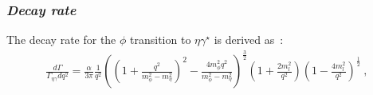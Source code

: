 \subsubsection{\emph{Decay rate}}
The decay rate for the $\phi$ transition to $\eta \gamma^\star$ is derived as~\cite{landsberg}:
\begin{align}
\frac{d\Gamma}{\Gamma_{\eta\gamma} dq^2} = \frac{\alpha}{3 \pi} \frac{1}{q^2} \left( \left(1+ \frac{q^2}{m_{\phi}^2 - m_{\eta}^2} \right)^2 - \frac{4 m_{\phi}^2 q^2}{m_{\phi}^2 - m_{\eta}^2}\right)^\frac{3}{2} \left( 1+ \frac{2m_l^2}{q^2}\right) \left( 1- \frac{4m_l^2}{q^2}\right)^{\frac{1}{2}} \ ,
\end{align}
 
